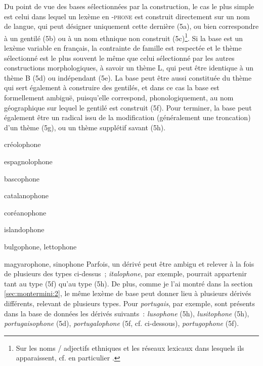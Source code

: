 \documentclass[output=paper]{langsci/langscibook}
\begin{document}
Du point de vue des bases sélectionnées par la construction, le cas le
plus simple est celui dans lequel un lexème en \textsc{-phone} est
construit directement sur un nom de langue, qui peut désigner uniquement
cette dernière (5a), ou bien correspondre à un gentilé (5b) ou à un nom
ethnique non construit (5c)\footnote{Sur les noms / adjectifs ethniques
  et les réseaux lexicaux dans lesquels ils apparaissent, cf. en
  particulier %
\citet{Roche2008a}%
%
.}. Si la base est un lexème variable en
français, la contrainte de famille est respectée et le thème sélectionné
est le plus souvent le même que celui sélectionné par les autres
constructions morphologiques, à savoir un thème L, qui peut être
identique à un thème B (5d) ou indépendant (5e). La base peut être aussi
constituée du thème qui sert également à construire des gentilés, et
dans ce cas la base est formellement ambiguë, puisqu'elle correspond,
phonologiquement, au nom géographique sur lequel le gentilé est
construit (5f). Pour terminer, la base peut également être un radical
issu de la modification (généralement une troncation) d'un thème (5g),
ou un thème supplétif savant (5h).

\ea\label{ex:Montermini:5}
    \ea\label{ex:Montermini:5a} {créolophone}

    \ex\label{ex:Montermini:5b}{espagnolophone}

    \ex\label{ex:Montermini:5c}{bascophone}

    \ex\label{ex:Montermini:5d}{catalanophone}

    \ex\label{ex:Montermini:5e}{coréanophone}

    \ex\label{ex:Montermini:5f}{islandophone}

    \ex\label{ex:Montermini:5g}{bulgophone}, {lettophone}

    \ex\label{ex:Montermini:5h}{magyarophone}, {sinophone}
\z\z
Parfois, un dérivé peut être ambigu et relever à la fois de plusieurs
des types ci-dessus~; \emph{italophone}, par exemple, pourrait
appartenir tant au type (5f) qu'au type (5h). De plus, comme je l'ai
montré dans la section \ref{sec:montermini:2}, le même lexème de base peut donner lieu à
plusieurs dérivés différents, relevant de plusieurs types. Pour
\emph{portugais}, par exemple, sont présents dans la base de données les
dérivés suivants~: \emph{lusophone} (5h), \emph{lusitophone} (5h),
\emph{portugaisophone} (5d), \emph{portugalophone} (5f, cf. ci-dessous),
\emph{portugophone} (5f).
\end{document}
